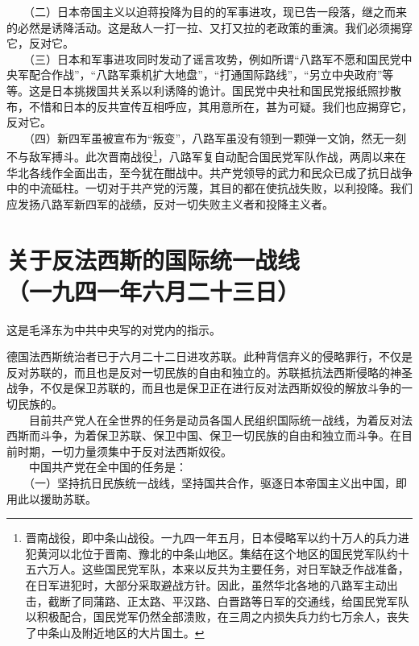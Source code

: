 \documentclass[cn,11pt,chinese]{elegantbook}
\def\myformat#1{\hfil\hfil #1}
\begin{document}
　　（二）日本帝国主义以迫蒋投降为目的的军事进攻，现已告一段落，继之而来的必然是诱降活动。这是敌人一打一拉、又打又拉的老政策的重演。我们必须揭穿它，反对它。\\
　　（三）日本和军事进攻同时发动了谣言攻势，例如所谓“八路军不愿和国民党中央军配合作战”，“八路军乘机扩大地盘”，“打通国际路线”，“另立中央政府”等等。这是日本挑拨国共关系以利诱降的诡计。国民党中央社和国民党报纸照抄散布，不惜和日本的反共宣传互相呼应，其用意所在，甚为可疑。我们也应揭穿它，反对它。\\
　　（四）新四军虽被宣布为“叛变”，八路军虽没有领到一颗弹一文饷，然无一刻不与敌军搏斗。此次晋南战役\footnote[1]{ 晋南战役，即中条山战役。一九四一年五月，日本侵略军以约十万人的兵力进犯黄河以北位于晋南、豫北的中条山地区。集结在这个地区的国民党军队约十五六万人。这些国民党军队，本来以反共为主要任务，对日军缺乏作战准备，在日军进犯时，大部分采取避战方针。因此，虽然华北各地的八路军主动出击，截断了同蒲路、正太路、平汉路、白晋路等日军的交通线，给国民党军队以积极配合，国民党军仍然全部溃败，在三周之内损失兵力约七万余人，丧失了中条山及附近地区的大片国土。}，八路军复自动配合国民党军队作战，两周以来在华北各线作全面出击，至今犹在酣战中。共产党领导的武力和民众已成了抗日战争中的中流砥柱。一切对于共产党的污蔑，其目的都在使抗战失败，以利投降。我们应发扬八路军新四军的战绩，反对一切失败主义者和投降主义者。\\
\newpage\section*{\myformat{关于反法西斯的国际统一战线}\\\myformat{（一九四一年六月二十三日）}}
\begin{introduction}\item  这是毛泽东为中共中央写的对党内的指示。\end{introduction}
德国法西斯统治者已于六月二十二日进攻苏联。此种背信弃义的侵略罪行，不仅是反对苏联的，而且也是反对一切民族的自由和独立的。苏联抵抗法西斯侵略的神圣战争，不仅是保卫苏联的，而且也是保卫正在进行反对法西斯奴役的解放斗争的一切民族的。\\
　　目前共产党人在全世界的任务是动员各国人民组织国际统一战线，为着反对法西斯而斗争，为着保卫苏联、保卫中国、保卫一切民族的自由和独立而斗争。在目前时期，一切力量须集中于反对法西斯奴役。\\
　　中国共产党在全中国的任务是：\\
　　（一）坚持抗日民族统一战线，坚持国共合作，驱逐日本帝国主义出中国，即用此以援助苏联。\\
\end{document}

